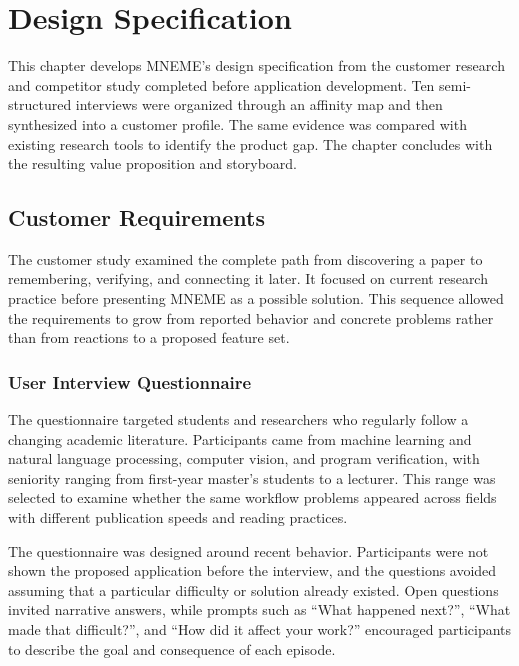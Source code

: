 

\chapter{Design Specification}

This chapter develops MNEME's design specification from the customer research
and competitor study completed before application development.  Ten
semi-structured interviews were organized through an affinity map and then
synthesized into a customer profile.  The same evidence was compared with
existing research tools to identify the product gap.  The chapter concludes
with the resulting value proposition and storyboard.

\section{Customer Requirements}

The customer study examined the complete path from discovering a paper to
remembering, verifying, and connecting it later.  It focused on current
research practice before presenting MNEME as a possible solution.  This
sequence allowed the requirements to grow from reported behavior and concrete
problems rather than from reactions to a proposed feature set.

\subsection{User Interview Questionnaire}

The questionnaire targeted students and researchers who regularly follow a
changing academic literature.  Participants came from machine learning and
natural language processing, computer vision, and program verification, with
seniority ranging from first-year master's students to a lecturer.  This range
was selected to examine whether the same workflow problems appeared across
fields with different publication speeds and reading practices.

The questionnaire was designed around recent behavior.  Participants were not
shown the proposed application before the interview, and the questions avoided
assuming that a particular difficulty or solution already existed.  Open
questions invited narrative answers, while prompts such as ``What happened
next?'', ``What made that difficult?'', and ``How did it affect your work?''
encouraged participants to describe the goal and consequence of each episode.

